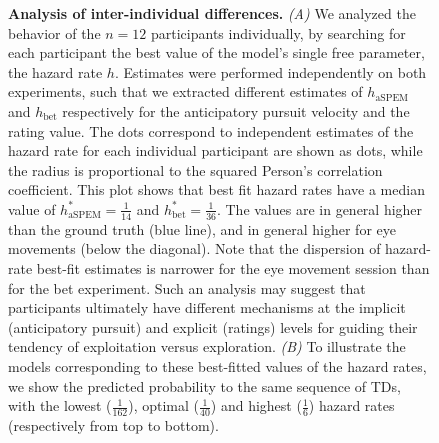 \documentclass[10pt,letterpaper]{article}
\begin{document}
\begin{figure}
\caption{\textbf{Analysis of inter-individual differences.} %
\textit{(A)} 
We analyzed the behavior of the $n=12$ participants individually, by searching for each participant
the best value of the model's single free parameter, the hazard rate $h$.
Estimates were performed independently on both experiments,
such that we extracted different estimates of $h_{\text{aSPEM}}$ and $h_{\text{bet}}$
respectively for the anticipatory pursuit velocity and the rating value.
The dots correspond to independent estimates of the hazard rate
for each individual participant are shown as dots,
while the radius is proportional to the squared Person's correlation coefficient.
This plot shows that best fit hazard rates have a median value of  $h^{*}_{\text{aSPEM}}=\frac{1}{14}$ and $h^{*}_{\text{bet}}=\frac{1}{36}$. 
The values are in general higher than the ground truth (blue line),
and in general higher for eye movements (below the diagonal).
Note that the dispersion of hazard-rate best-fit estimates is narrower
for the eye movement session than for the bet experiment.
Such an analysis may suggest that participants ultimately have
different mechanisms at the implicit (anticipatory pursuit) and explicit (ratings) levels
for guiding their tendency of exploitation versus exploration.
\textit{(B)} To illustrate the models corresponding to these best-fitted values of the hazard rates,
we show the predicted probability to the same sequence of TDs, 
with the lowest ($\frac{1}{162}$), optimal ($\frac{1}{40}$) and highest ($\frac{1}{6}$) hazard rates
(respectively from top to bottom).
}
\label{fig:results_inter}
\end{figure}
\end{document}
